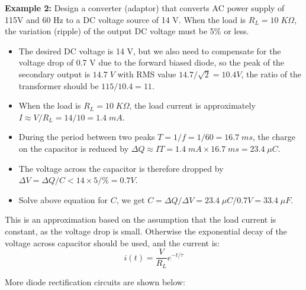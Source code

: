 \documentclass{article}
\begin{document}
{\bf Example 2: } Design a converter (adaptor) that converts AC power 
supply of 115V and 60 Hz to a DC voltage source of 14 V. When the load is
$R_L=10\;K\Omega$, the variation (ripple) of the output DC voltage must 
be 5\% or less.



\begin{itemize}
\item The desired DC voltage is 14 V, but we also need to compensate for the
  voltage drop of 0.7 V due to the forward biased diode, so the  peak of the
  secondary output is $14.7\;V$ with RMS value $14.7/\sqrt{2}=10.4V$, the ratio
  of the transformer should be $115/10.4=11$. 
\item When the load is $R_L=10\;K\Omega$, the load current is approximately
  $I\approx V/R_L=14/10=1.4\;mA$.
\item During the period between two peaks $T=1/f=1/60=16.7\;ms$, the charge 
	on the capacitor is reduced by $\Delta Q\approx IT=1.4\;mA\times 
        16.7\;ms=23.4\;\mu C$. 	
\item The voltage across the capacitor is therefore dropped by
	$\Delta V=\Delta Q/C < 14\times 5/\%=0.7V $. 
\item Solve above equation for $C$, we get $C=\Delta Q/\Delta V
  =23.4\;\mu C/0.7V=33.4\;\mu F$.
\end{itemize}
This is an approximation based on the assumption that the load current is
constant, as the voltage drop is small. Otherwise the exponential decay of
the voltage across capacitor should be used, and the current is:
\begin{equation}	i(t)=\frac{V}{R_L} e^{-t/\tau}	\end{equation}

More diode rectification circuits are shown below:



\begin{comment}
In the circuit on the left, voltages on $C_1$ and $C_2$ are both the 
same as the peak votage on the secondary side of the transformer, and
the voltage across $R_L$ is twice the voltage.

In the circuit on the right, voltage on $C_1$ is the peak voltage on 
the 2nd side of the transformer, voltegaes on both $C_2$ and $C_3$ 
are twice the voltage,  and the voltage across $R_L$ is three times
of that voltage.
\end{comment}
\end{document}
